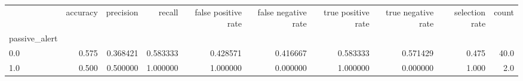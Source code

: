 \begin{tabular}{lrrrrrrrrr}
\toprule
{} &  accuracy &  precision &    recall &  false positive rate &  false negative rate &  true positive rate &  true negative rate &  selection rate &  count \\
passive\_alert &           &            &           &                      &                      &                     &                     &                 &        \\
\midrule
0.0           &     0.575 &   0.368421 &  0.583333 &             0.428571 &             0.416667 &            0.583333 &            0.571429 &           0.475 &   40.0 \\
1.0           &     0.500 &   0.500000 &  1.000000 &             1.000000 &             0.000000 &            1.000000 &            0.000000 &           1.000 &    2.0 \\
\bottomrule
\end{tabular}
